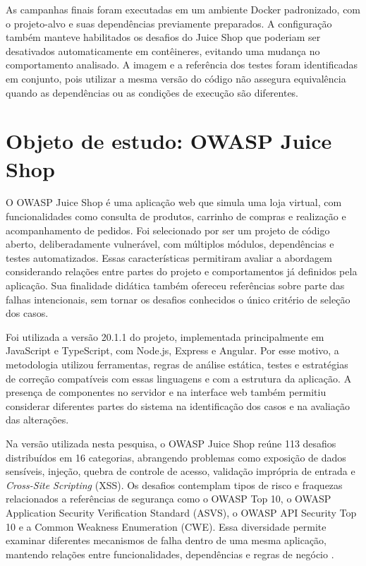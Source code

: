 As campanhas finais foram executadas em um ambiente Docker padronizado, com o projeto-alvo e suas dependências previamente preparados. A configuração também manteve habilitados os desafios do Juice Shop que poderiam ser desativados automaticamente em contêineres, evitando uma mudança no comportamento analisado. A imagem e a referência dos testes foram identificadas em conjunto, pois utilizar a mesma versão do código não assegura equivalência quando as dependências ou as condições de execução são diferentes.

\section{Objeto de estudo: OWASP Juice Shop}
\label{sec:met-objeto}

O OWASP Juice Shop é uma aplicação web que simula uma loja virtual, com funcionalidades como consulta de produtos, carrinho de compras e realização e acompanhamento de pedidos. Foi selecionado por ser um projeto de código aberto, deliberadamente vulnerável, com múltiplos módulos, dependências e testes automatizados. Essas características permitiram avaliar a abordagem considerando relações entre partes do projeto e comportamentos já definidos pela aplicação. Sua finalidade didática também ofereceu referências sobre parte das falhas intencionais, sem tornar os desafios conhecidos o único critério de seleção dos casos.

Foi utilizada a versão 20.1.1 do projeto, implementada principalmente em JavaScript e TypeScript, com Node.js, Express e Angular. Por esse motivo, a metodologia utilizou ferramentas, regras de análise estática, testes e estratégias de correção compatíveis com essas linguagens e com a estrutura da aplicação. A presença de componentes no servidor e na interface web também permitiu considerar diferentes partes do sistema na identificação dos casos e na avaliação das alterações.

Na versão utilizada nesta pesquisa, o OWASP Juice Shop reúne 113 desafios distribuídos em 16 categorias, abrangendo problemas como exposição de dados sensíveis, injeção, quebra de controle de acesso, validação imprópria de entrada e \textit{Cross-Site Scripting} (XSS). Os desafios contemplam tipos de risco e fraquezas relacionados a referências de segurança como o OWASP Top 10, o OWASP Application Security Verification Standard (ASVS), o OWASP API Security Top 10 e a Common Weakness Enumeration (CWE). Essa diversidade permite examinar diferentes mecanismos de falha dentro de uma mesma aplicação, mantendo relações entre funcionalidades, dependências e regras de negócio \cite{juice_shop}.

